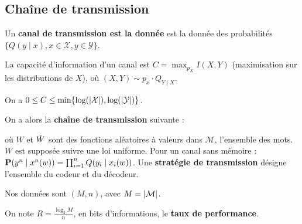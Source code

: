\subsection{Chaîne de transmission}

	\begin{defn}
		Un \textbf{canal de transmission est la donnée} est la donnée des probabilités $\{ Q(y \mid x), x \in \mathcal{X}, y \in \mathcal{Y} \}$.
	\end{defn}

	\begin{defn}
		La capacité d'information d'un canal est $C = \max_{p_X} I(X,Y)$ (maximisation sur les distributions de $X$), où $(X,Y) \sim p_x \cdot Q_{Y \mid X}$.
	\end{defn}

	\begin{pop}
		On a $0 \leq C \leq \min \{ \log (\left\lvert\mathcal{X}\right\rvert), \log (\left\lvert\mathcal{Y}\right\rvert) \}$.
	\end{pop}

	On a alors la \textbf{chaîne de transmission} suivante :
	\vspace{0.5em}


	où $W$ et $\Tilde{W}$ sont des fonctions aléatoires à valeurs dans $\mathcal{M}$, l'ensemble des mots.
	$W$ est supposée suivre une loi uniforme.
	Pour un canal sans mémoire : $\mathbf{P}(y^n \mid x^n(w)) = \prod_{i = 1}^n Q(y_i \mid x_i(w))$.
	Une \textbf{stratégie de transmission} désigne l'ensemble du codeur et du décodeur.

	Nos données sont $(M,n)$, avec $M = \left\lvert\mathcal{M}\right\rvert$.

	\begin{defn}
		On note $R = \frac{\log_2 M}{n}$, en bits d'informations, le \textbf{taux de performance}.
	\end{defn}


